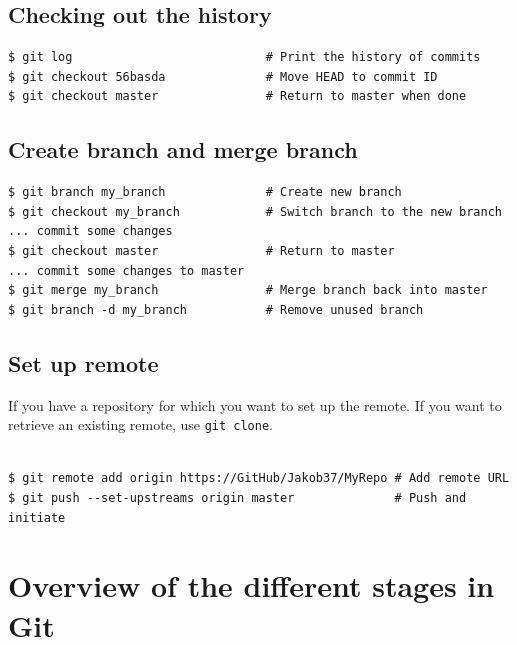 \documentclass[12pt]{report}
\begin{document}
\subsection*{Checking out the history}

\begin{codebox}
\begin{verbatim}
$ git log                           # Print the history of commits
$ git checkout 56basda              # Move HEAD to commit ID
$ git checkout master               # Return to master when done
\end{verbatim}
\end{codebox}

\subsection*{Create branch and merge branch}

\begin{codebox}
\begin{verbatim}
$ git branch my_branch              # Create new branch
$ git checkout my_branch            # Switch branch to the new branch
... commit some changes
$ git checkout master               # Return to master
... commit some changes to master
$ git merge my_branch               # Merge branch back into master
$ git branch -d my_branch           # Remove unused branch
\end{verbatim}
\end{codebox}

\subsection*{Set up remote}

If you have a repository for which you want to set up the remote. If you want to retrieve an existing remote, use \verb$git clone$. \\\\
\begin{codebox}
\begin{verbatim}
$ git remote add origin https://GitHub/Jakob37/MyRepo # Add remote URL
$ git push --set-upstreams origin master              # Push and initiate
\end{verbatim}
\end{codebox}

\newpage

\section*{Overview of the different stages in Git}
\end{document}
